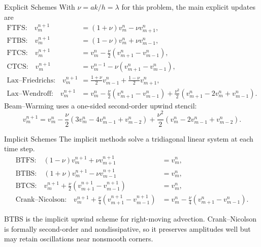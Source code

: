 \documentclass[aspectratio=169,10pt]{beamer}
\begin{document}
\begin{frame}{Explicit Schemes}
    With $\nu=a k/h=\lambda$ for this problem, the main explicit updates are
    \scriptsize
    \begin{align}
        \text{FTFS:}\quad
        v_m^{n+1}&=(1+\nu)v_m^n-\nu v_{m+1}^n,\\
        \text{FTBS:}\quad
        v_m^{n+1}&=(1-\nu)v_m^n+\nu v_{m-1}^n,\\
        \text{FTCS:}\quad
        v_m^{n+1}&=v_m^n-\frac{\nu}{2}(v_{m+1}^n-v_{m-1}^n),\\
        \text{CTCS:}\quad
        v_m^{n+1}&=v_m^{n-1}-\nu(v_{m+1}^n-v_{m-1}^n),\\
        \text{Lax--Friedrichs:}\quad
        v_m^{n+1}&=\frac{1+\nu}{2}v_{m-1}^n+\frac{1-\nu}{2}v_{m+1}^n,\\
        \text{Lax--Wendroff:}\quad
        v_m^{n+1}&=v_m^n-\frac{\nu}{2}(v_{m+1}^n-v_{m-1}^n)
        +\frac{\nu^2}{2}(v_{m+1}^n-2v_m^n+v_{m-1}^n).
    \end{align}
    \normalsize
    Beam--Warming uses a one-sided second-order upwind stencil:
    \[
        v_m^{n+1}=v_m^n-\frac{\nu}{2}(3v_m^n-4v_{m-1}^n+v_{m-2}^n)
        +\frac{\nu^2}{2}(v_m^n-2v_{m-1}^n+v_{m-2}^n).
    \]
\end{frame}

\begin{frame}{Implicit Schemes}
    The implicit methods solve a tridiagonal linear system at each time step.
    \small
    \begin{align}
        \text{BTFS:}\quad
        (1-\nu)v_m^{n+1}+\nu v_{m+1}^{n+1}
        &=v_m^n,\\
        \text{BTBS:}\quad
        (1+\nu)v_m^{n+1}-\nu v_{m-1}^{n+1}
        &=v_m^n,\\
        \text{BTCS:}\quad
        v_m^{n+1}
        +\frac{\nu}{2}(v_{m+1}^{n+1}-v_{m-1}^{n+1})
        &=v_m^n,\\
        \text{Crank--Nicolson:}\quad
        v_m^{n+1}
        +\frac{\nu}{4}(v_{m+1}^{n+1}-v_{m-1}^{n+1})
        &=
        v_m^n-\frac{\nu}{4}(v_{m+1}^{n}-v_{m-1}^{n}).
    \end{align}

    \vspace{0.15cm}
    BTBS is the implicit upwind scheme for right-moving advection.  Crank--Nicolson is formally second-order and nondissipative, so it preserves amplitudes well but may retain oscillations near nonsmooth corners.
\end{frame}
\end{document}
